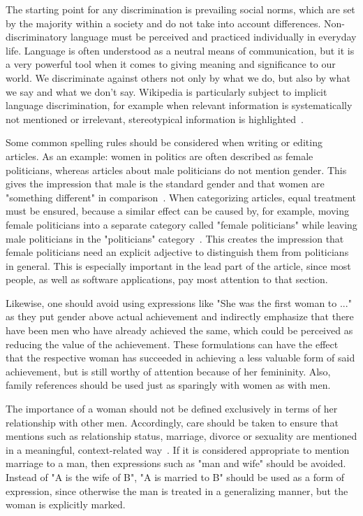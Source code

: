 \documentclass[a4paper, 11pt]{article}
\begin{document}
The starting point for any discrimination is prevailing social norms, which are set by the majority within a society and do not take into account differences. Non-discriminatory language must be perceived and practiced individually in everyday life. Language is often understood as a neutral means of communication, but it is a very powerful tool when it comes to giving meaning and significance to our world. We discriminate against others not only by what we do, but also by what we say and what we don't say. Wikipedia is particularly subject to implicit language discrimination, for example when relevant information is systematically not mentioned or irrelevant, stereotypical information is highlighted~\cite{wagner2016women}.

Some common spelling rules should be considered when writing or editing articles. As an example: women in politics are often described as female politicians, whereas articles about male politicians do not mention gender. This gives the impression that male is the standard gender and that women are "something different" in comparison~\cite{wagner2016women}. When categorizing articles, equal treatment must be ensured, because a similar effect can be caused by, for example, moving female politicians into a separate category called "female politicians" while leaving male politicians in the "politicians" category~\cite{flood2013guardian}. This creates the impression that female politicians need an explicit adjective to distinguish them from politicians in general. This is especially important in the lead part of the article, since most people, as well as software applications, pay most attention to that section.

Likewise, one should avoid using expressions like "She was the first woman to ..." as they put gender above actual achievement and indirectly emphasize that there have been men who have already achieved the same, which could be perceived as reducing the value of the achievement. These formulations can have the effect that the respective woman has succeeded in achieving a less valuable form of said achievement, but is still worthy of attention because of her femininity. Also, family references should be used just as sparingly with women as with men.

The importance of a woman should not be defined exclusively in terms of her relationship with other men. Accordingly, care should be taken to ensure that mentions such as relationship status, marriage, divorce or sexuality are mentioned in a meaningful, context-related way~\cite{graells2015first}. If it is considered appropriate to mention marriage to a man, then expressions such as "man and wife" should be avoided. Instead of "A is the wife of B", "A is married to B" should be used as a form of expression, since otherwise the man is treated in a generalizing manner, but the woman is explicitly marked.
\end{document}

